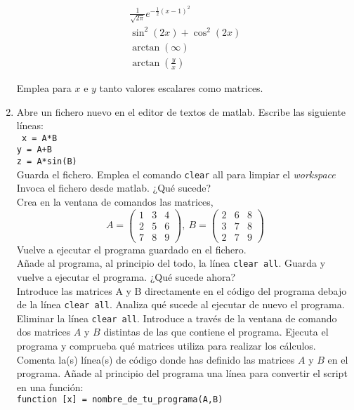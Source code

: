 \begin{enumerate}
\begin{multicols}{2}
\begin{align*}
\frac{1}{\sqrt{2\pi}}e^{-\frac{1}{2}(x-1)^2}\\
\sin^2(2x)+\cos^2(2x) \\
\arctan(\infty)\\
\arctan\left(\frac{y}{x}\right)
\end{align*}
\end{multicols}
Emplea para $x$ e $y$ tanto valores escalares como matrices.

\item Abre un fichero nuevo en el editor de textos de matlab.
Escribe las siguiente líneas:\\
\texttt{
x = A*B\\
y = A+B\\
z = A*sin(B)}\\
Guarda el fichero. Emplea el comando \verb|clear| all para limpiar el \emph{workspace}
Invoca el fichero desde matlab. ¿Qué sucede?\\
Crea en la ventana de comandos las matrices,
\begin{equation*}
A =\begin{pmatrix}
1&3&4\\
2&5&6\\
7&8&9
\end{pmatrix}, \ B=\begin{pmatrix}
2&6&8\\
3&7&8\\
2&7&9
\end{pmatrix}
\end{equation*}
Vuelve a ejecutar el programa guardado en el fichero.\\
Añade al programa, al principio del todo, la línea \texttt{clear all}. Guarda y vuelve a ejecutar el
programa. ¿Qué sucede ahora?\\
Introduce las matrices A y B directamente en el código del programa debajo de la línea \texttt{clear all}. Analiza qué sucede al ejecutar de nuevo el programa.\\
 Eliminar la línea \texttt{clear all}. Introduce a través de la ventana de comando dos matrices $A$ y $B$ distintas de las que contiene el programa. Ejecuta el programa y comprueba qué matrices utiliza para realizar los cálculos.\\
Comenta la(s) línea(s) de código donde has definido las matrices $A$ y $B$ en el programa. Añade al principio del programa una línea para convertir el script en una función:\\
\verb|function [x] = nombre_de_tu_programa(A,B)| \\

\end{enumerate}

